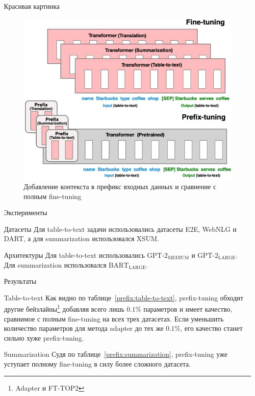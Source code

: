 \documentclass[9pt]{beamer}
\begin{document}
\begin{frame}{Красивая картинка}
    \begin{figure}
        \caption{Добавление контекста в префикс входных данных и сравнение с полным fine-tuning}
        \begin{center}
            \includegraphics[scale=0.5]{images/prefix_1.jpg}
        \end{center}
    \end{figure}
\end{frame}


\begin{frame}{Эксперименты}
    
    \begin{block}{Датасеты}
        Для table-to-text задачи использовались датасеты E2E, WebNLG и DART, а для summarization использовался XSUM.
    \end{block}
    
    \begin{block}{Архитектуры}
        Для table-to-text использовались $\text{GPT-2}_{\text{MEDIUM}}$ и $\text{GPT-2}_{\text{LARGE}}$. Для summarization использовался $\text{BART}_{\text{LARGE}}$.
    \end{block}

\end{frame}

\begin{frame}{Результаты}

    \begin{block}{Table-to-text}
        Как видно по таблице~\ref{prefix:table-to-text}, prefix-tuning обходит другие бейзлайны\footnote{Adapter и FT-TOP2} добавляя всего лишь $0.1\%$ параметров и имеет качество, сравнимое с полным fine-tuning на всех трех датасетах. Если уменьшить количество параметров для метода adapter до тех же $0.1\%$, его качество станет сильно хуже prefix-tuning.
    \end{block}

    \begin{block}{Summarization}
        Судя по таблице~\ref{prefix:summarization}, prefix-tuning уже уступает полному fine-tuning в силу более сложного датасета.
    \end{block}

\end{frame}
\end{document}

